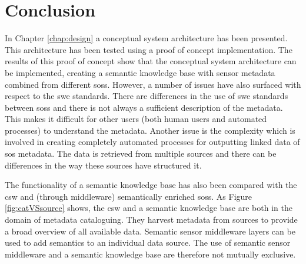 \section{Conclusion}
In Chapter \ref{chap:design} a conceptual system architecture has been presented. This architecture has been tested using a proof of concept implementation. The results of this proof of concept show that the conceptual system architecture can be implemented, creating a semantic knowledge base with sensor metadata combined from different \aclp{sos}. However, a number of issues have also surfaced with respect to the \ac{swe} standards. There are differences in the use of \ac{swe} standards between \aclp{sos} and there is not always a sufficient description of the metadata. This makes it difficult for other users (both human users and automated processes) to understand the metadata. Another issue is the complexity which is involved in creating completely automated processes for outputting linked data of \ac{sos} metadata. The data is retrieved from multiple sources and there can be differences in the way these sources have structured it. 

The functionality of a semantic knowledge base has also been compared with the \ac{csw} and (through middleware) semantically enriched \aclp{sos}. As Figure \ref{fig:catVSsource} shows, the \ac{csw} and a semantic knowledge base are both in the domain of metadata cataloguing. They harvest metadata from sources to provide a broad overview of all available data. Semantic sensor middleware layers can be used to add semantics to an individual data source. The use of semantic sensor middleware and a semantic knowledge base are therefore not mutually exclusive. 
   
